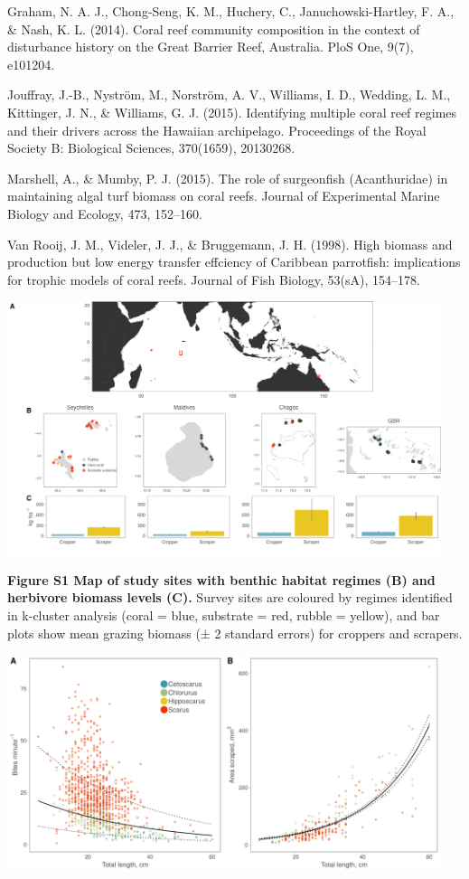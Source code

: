 \documentclass[12pt,]{article}
\begin{document}
Graham, N. A. J., Chong-Seng, K. M., Huchery, C., Januchowski-Hartley,
F. A., \& Nash, K. L. (2014). Coral reef community composition in the
context of disturbance history on the Great Barrier Reef, Australia.
PloS One, 9(7), e101204.

Jouffray, J.-B., Nyström, M., Norström, A. V., Williams, I. D., Wedding,
L. M., Kittinger, J. N., \& Williams, G. J. (2015). Identifying multiple
coral reef regimes and their drivers across the Hawaiian archipelago.
Proceedings of the Royal Society B: Biological Sciences, 370(1659),
20130268.

Marshell, A., \& Mumby, P. J. (2015). The role of surgeonfish
(Acanthuridae) in maintaining algal turf biomass on coral reefs. Journal
of Experimental Marine Biology and Ecology, 473, 152--160.

Van Rooij, J. M., Videler, J. J., \& Bruggemann, J. H. (1998). High
biomass and production but low energy transfer effciency of Caribbean
parrotfish: implications for trophic models of coral reefs. Journal of
Fish Biology, 53(sA), 154--178.

\begin{center}\includegraphics[width=480px]{../../figures/Figure1} \end{center}

\textbf{Figure S1 \textbar{} Map of study sites with benthic habitat
regimes (B) and herbivore biomass levels (C).} Survey sites are coloured
by regimes identified in k-cluster analysis (coral = blue, substrate =
red, rubble = yellow), and bar plots show mean grazing biomass (± 2
standard errors) for croppers and scrapers.

\newpage

\begin{center}\includegraphics[width=480px]{../../figures/FigureS1_scrape_size} \end{center}
\end{document}
